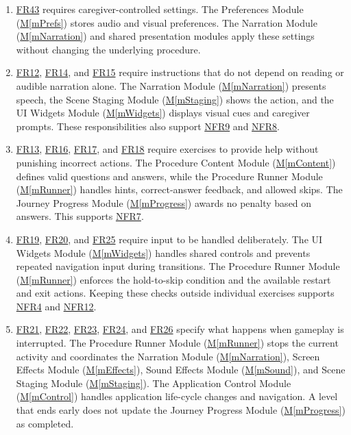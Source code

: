\documentclass[10pt, titlepage]{article}
\newcommand{\srsurl}{https://team-hindsight.github.io/ophthamology-game/SRS/SRS.pdf}
\newcommand{\srsitemref}[2]{\href{\srsurl\#nameddest=#1}{#2}}
\newcommand{\mref}[1]{\texorpdfstring{\hyperref[md:#1]{M\ref*{#1}}}{M\ref*{#1}}}
\begin{document}
\begin{enumerate}[leftmargin=*, itemsep=0.5em, parsep=0.15em]
\item \srsitemref{FR_Preferences}{FR43} requires caregiver-controlled
  settings. The Preferences Module (\mref{mPrefs}) stores audio and visual
  preferences. The Narration Module (\mref{mNarration}) and shared
  presentation modules apply these settings without changing the underlying
  procedure.

\item \srsitemref{FR_SpokenInstructions}{FR12}, \srsitemref{FR_VisualCues}{FR14},
  and \srsitemref{FR_NarrationFallback}{FR15} require instructions that do not
  depend on reading or audible narration alone. The Narration Module
  (\mref{mNarration}) presents speech, the Scene Staging Module
  (\mref{mStaging}) shows the action, and the UI Widgets Module
  (\mref{mWidgets}) displays visual cues and caregiver prompts. These
  responsibilities also support \srsitemref{NFR_Accessibility}{NFR9} and
  \srsitemref{NFR_Language}{NFR8}.

\item \srsitemref{FR_HintOnMiss}{FR13}, \srsitemref{FR_RevealAnswer}{FR16},
  \srsitemref{FR_ValidQuestions}{FR17}, and \srsitemref{FR_NoPenalty}{FR18}
  require exercises to provide help without punishing incorrect actions. The
  Procedure Content Module (\mref{mContent}) defines valid questions and
  answers, while the Procedure Runner Module (\mref{mRunner}) handles hints,
  correct-answer feedback, and allowed skips. The Journey Progress Module
  (\mref{mProgress}) awards no penalty based on answers. This supports
  \srsitemref{NFR_NoPressure}{NFR7}.

\item \srsitemref{FR_IgnoreRepeatedTouches}{FR19},
  \srsitemref{FR_HoldSkip}{FR20}, and \srsitemref{FR_RestartLevel}{FR25}
  require input to be handled deliberately. The UI Widgets Module
  (\mref{mWidgets}) handles shared controls and prevents repeated navigation
  input during transitions. The Procedure Runner Module (\mref{mRunner})
  enforces the hold-to-skip condition and the available restart and exit
  actions. Keeping these checks outside individual exercises supports
  \srsitemref{NFR_Exit}{NFR4} and \srsitemref{NFR_Responsiveness}{NFR12}.

\item \srsitemref{FR_ExitLevel}{FR21}, \srsitemref{FR_StopOnExit}{FR22},
  \srsitemref{FR_ExitKeepsData}{FR23}, \srsitemref{FR_RestartAfterExit}{FR24},
  and \srsitemref{FR_Suspend}{FR26} specify what happens when gameplay is
  interrupted. The Procedure Runner Module (\mref{mRunner}) stops the current
  activity and coordinates the Narration Module (\mref{mNarration}), Screen
  Effects Module (\mref{mEffects}), Sound Effects Module (\mref{mSound}), and
  Scene Staging Module (\mref{mStaging}). The Application Control Module
  (\mref{mControl}) handles application life-cycle changes and navigation.
  A level that ends early does not update the Journey Progress Module
  (\mref{mProgress}) as completed.


\end{enumerate}
\end{document}
